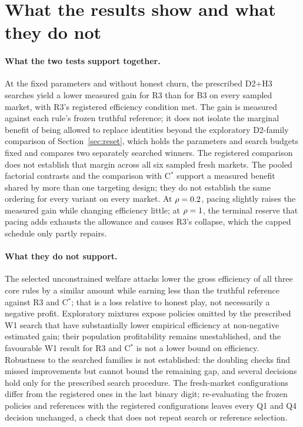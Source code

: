 \documentclass[11pt]{article}
\begin{document}
\section{What the results show and what they do not}\label{sec:discussion}
\paragraph{What the two tests support together.} At the fixed parameters and without honest churn, the prescribed D2+H3 searches yield a lower measured gain for R3 than for B3 on every sampled market, with R3's registered efficiency condition met. The gain is measured against each rule's frozen truthful reference; it does not isolate the marginal benefit of being allowed to replace identities beyond the exploratory D2-family comparison of Section~\ref{sec:reset}, which holds the parameters and search budgets fixed and compares two separately searched winners. The registered comparison does not establish that margin across all six sampled fresh markets. The pooled factorial contrasts and the comparison with C$^*$ support a measured benefit shared by more than one targeting design; they do not establish the same ordering for every variant on every market. At $\rho = 0.2$, pacing slightly raises the measured gain while changing efficiency little; at $\rho = 1$, the terminal reserve that pacing adds exhausts the allowance and causes R3's collapse, which the capped schedule only partly repairs.

\paragraph{What they do not support.} The selected unconstrained welfare attacks lower the gross efficiency of all three core rules by a similar amount while earning less than the truthful reference against R3 and C$^*$; that is a loss relative to honest play, not necessarily a negative profit. Exploratory mixtures expose policies omitted by the prescribed W1 search that have substantially lower empirical efficiency at non-negative estimated gain; their population profitability remains unestablished, and the favourable W1 result for R3 and C$^*$ is not a lower bound on efficiency. Robustness to the searched families is not established: the doubling checks find missed improvements but cannot bound the remaining gap, and several decisions hold only for the prescribed search procedure. The fresh-market configurations differ from the registered ones in the last binary digit; re-evaluating the frozen policies and references with the registered configurations leaves every Q1 and Q4 decision unchanged, a check that does not repeat search or reference selection.
\end{document}
